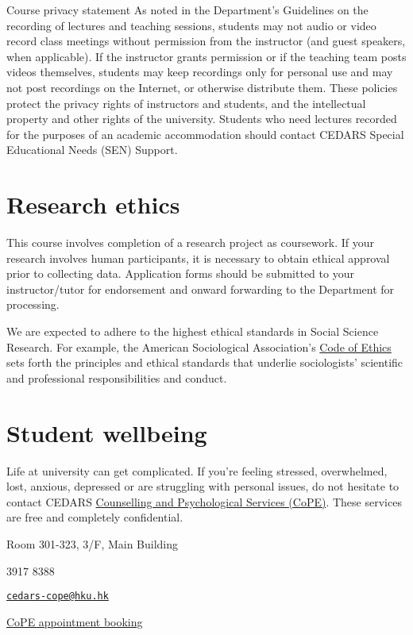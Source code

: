 \documentclass[
  letterpaper,
  DIV=11,
  numbers=noendperiod]{scrartcl}
\begin{document}
\begin{itemize}
  Course privacy statement As noted in the Department's Guidelines on
  the recording of lectures and teaching sessions, students may not
  audio or video record class meetings without permission from the
  instructor (and guest speakers, when applicable). If the instructor
  grants permission or if the teaching team posts videos themselves,
  students may keep recordings only for personal use and may not post
  recordings on the Internet, or otherwise distribute them. These
  policies protect the privacy rights of instructors and students, and
  the intellectual property and other rights of the university. Students
  who need lectures recorded for the purposes of an academic
  accommodation should contact CEDARS Special Educational Needs (SEN)
  Support.
\end{itemize}

\section{Research ethics}\label{research-ethics}

This course involves completion of a research project as coursework. If
your research involves human participants, it is necessary to obtain
ethical approval prior to collecting data. Application forms should be
submitted to your instructor/tutor for endorsement and onward forwarding
to the Department for processing.

We are expected to adhere to the highest ethical standards in Social
Science Research. For example, the American Sociological Association's
\href{https://www.asanet.org/wp-content/uploads/asa_code_of_ethics-june2018a.pdf}{Code
of Ethics} sets forth the principles and ethical standards that underlie
sociologists' scientific and professional responsibilities and conduct.

\section{Student wellbeing}\label{student-wellbeing}

Life at university can get complicated. If you're feeling stressed,
overwhelmed, lost, anxious, depressed or are struggling with personal
issues, do not hesitate to contact CEDARS
\href{https://www.cedars.hku.hk/cope/cps}{Counselling and Psychological
Services (CoPE)}. These services are free and completely confidential.

Room 301-323, 3/F, Main Building

3917 8388

\href{mailto:cedars-cope@hku.hk}{\nolinkurl{cedars-cope@hku.hk}}

\href{https://www.cedars.hku.hk/cope/cps/appointment}{CoPE appointment
booking}
\end{document}
